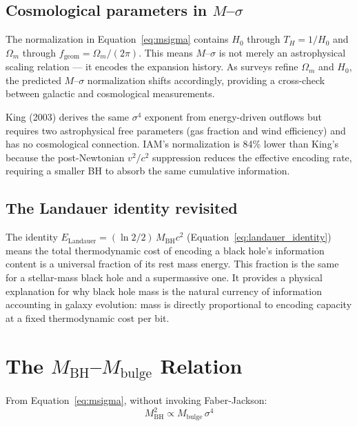 \documentclass[12pt,a4paper]{article}
\begin{document}
\subsection{Cosmological parameters in $M$--$\sigma$}

The normalization in Equation~\ref{eq:msigma} contains $H_0$ through
$T_H = 1/H_0$ and $\Omega_m$ through $f_\mathrm{geom} = \Omega_m/(2\pi)$.
This means $M$--$\sigma$ is not merely an astrophysical scaling relation --- it
encodes the expansion history. As surveys refine $\Omega_m$ and $H_0$, the
predicted $M$--$\sigma$ normalization shifts accordingly, providing a cross-check
between galactic and cosmological measurements.

King (2003) derives the same $\sigma^4$ exponent from energy-driven outflows but
requires two astrophysical free parameters (gas fraction and wind efficiency) and
has no cosmological connection. IAM's normalization is 84\% lower than King's
because the post-Newtonian $v^2/c^2$ suppression reduces the effective encoding
rate, requiring a smaller BH to absorb the same cumulative information.

\subsection{The Landauer identity revisited}

The identity $E_\mathrm{Landauer} = (\ln 2/2)\,M_\mathrm{BH} c^2$
(Equation~\ref{eq:landauer_identity}) means the total thermodynamic cost of
encoding a black hole's information content is a universal fraction of its rest
mass energy. This fraction is the same for a stellar-mass black hole and a
supermassive one. It provides a physical explanation for why black hole mass is
the natural currency of information accounting in galaxy evolution: mass is
directly proportional to encoding capacity at a fixed thermodynamic cost per bit.

\section{The $M_\mathrm{BH}$--$M_\mathrm{bulge}$ Relation}

From Equation~\ref{eq:msigma}, without invoking Faber-Jackson:
\begin{equation}
M_\mathrm{BH}^2 \propto M_\mathrm{bulge}\,\sigma^4
\end{equation}
\end{document}
